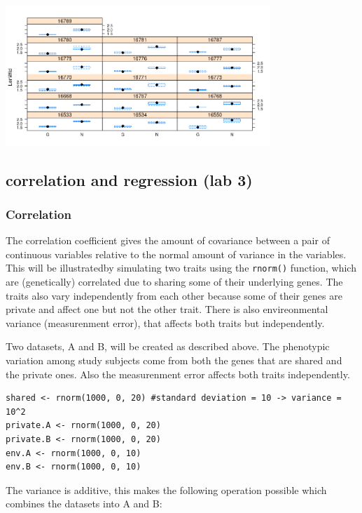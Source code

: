 \documentclass{article}
\begin{document}
\begin{center}
    \includegraphics[width = 0.75\textwidth]{lab2/ex4.png}
\end{center}

\subsection{correlation and regression (lab 3)}

\subsubsection{Correlation}
The correlation coefficient gives the amount of covariance between a pair of continuous variables relative to the normal amount of variance in the variables. This will be illustratedby simulating two traits using the \texttt{rnorm()} function, which are (genetically) correlated due to sharing some of their underlying genes. The traits also vary independently from each other because some of their genes are private and affect one but not the other trait. There is also envireonmental variance (measurenment error), that affects both traits but independently.\par 
Two datasets, A and B, will be created as described above. The phenotypic variation among study subjects come from both the genes that are shared and the private ones. Also the measurenment error affects both traits independently.

\begin{lstlisting}
shared <- rnorm(1000, 0, 20) #standard deviation = 10 -> variance = 10^2
private.A <- rnorm(1000, 0, 20)
private.B <- rnorm(1000, 0, 20)
env.A <- rnorm(1000, 0, 10)
env.B <- rnorm(1000, 0, 10)
\end{lstlisting}
\noindent
The variance is additive, this makes the following operation possible which combines the datasets into A and B:
\end{document}
